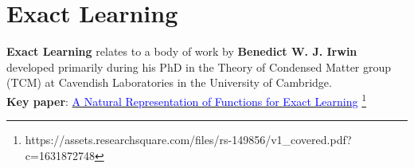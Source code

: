 \documentclass{article}
\begin{document}
%




\section{Exact Learning}
\textbf{Exact Learning} relates to a body of work by \textbf{Benedict W. J. Irwin} developed primarily during his PhD in the Theory of Condensed Matter group (TCM) at Cavendish Laboratories in the University of Cambridge.\\
\textbf{Key paper}:  \href{https://assets.researchsquare.com/files/rs-149856/v1_covered.pdf?c=1631872748 }{\textcolor{blue}{A Natural Representation of Functions for Exact Learning}} 
\footnote{https://assets.researchsquare.com/files/rs-149856/v1\_covered.pdf?c=1631872748 } \\
\end{document}
